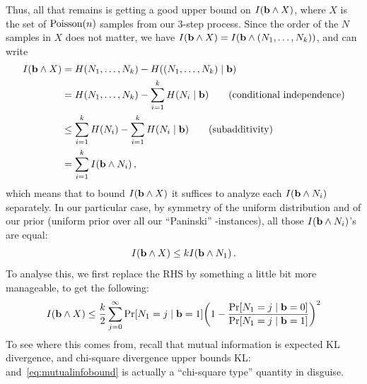Thus, all that remains is getting a good upper bound on $\mutualinfo{\mathbf{b}}{X}$, where $X$ is the set of $\poisson{\ns}$ samples from our 3-step process. Since the order of the $N$ samples in $X$ does not matter, we have 
$
\mutualinfo{\mathbf{b}}{X} = \mutualinfo{\mathbf{b}}{(\occur_1,\dots,\occur_\ab)}
$, and can write
\begin{align*}
\mutualinfo{\mathbf{b}}{X} 
&= \entropy{\occur_1,\dots,\occur_\ab} - \entropy{(\occur_1,\dots,\occur_\ab) \mid \mathbf{b}}  \\
&= \entropy{\occur_1,\dots,\occur_\ab} - \sum_{i=1}^\ab \entropy{\occur_i \mid \mathbf{b}}  \tag{conditional independence}\\
&\leq \sum_{i=1}^\ab \entropy{\occur_i} - \sum_{i=1}^\ab \entropy{\occur_i \mid \mathbf{b}}  \tag{subadditivity}\\
&= \sum_{i=1}^\ab\mutualinfo{\mathbf{b}}{\occur_i}\,,
\end{align*}
which means that to bound $\mutualinfo{\mathbf{b}}{X} $ it suffices to analyze each $\mutualinfo{\mathbf{b}}{\occur_i}$ separately. In our particular case, by symmetry of the uniform distribution and of our prior (uniform prior over all our ``Paninski'' \no-instances), all those $\mutualinfo{\mathbf{b}}{\occur_i}$'s are equal:
\begin{equation}
	\mutualinfo{\mathbf{b}}{X}  \leq \ab \mutualinfo{\mathbf{b}}{\occur_1}\,.
\end{equation}
To analyse this, we first replace the RHS by something a little bit more manageable, to get the following:
\begin{equation}
	\label{eq:mutualinfobound}
	\mutualinfo{\mathbf{b}}{X}  
	\leq \frac{\ab}{2} \sum_{j=0}^\infty \bPr{\occur_1=j\mid \mathbf{b}=\accept }\Paren{1-  \frac{\bPr{\occur_1=j\mid \mathbf{b}=\reject }}{\bPr{\occur_1=j\mid \mathbf{b}=\accept }}  }^2 
\end{equation}
To see where this comes from, recall that mutual information is expected KL divergence, and chi-square divergence upper bounds KL: and~\cref{eq:mutualinfobound} is actually a ``chi-square type'' quantity in disguise.
